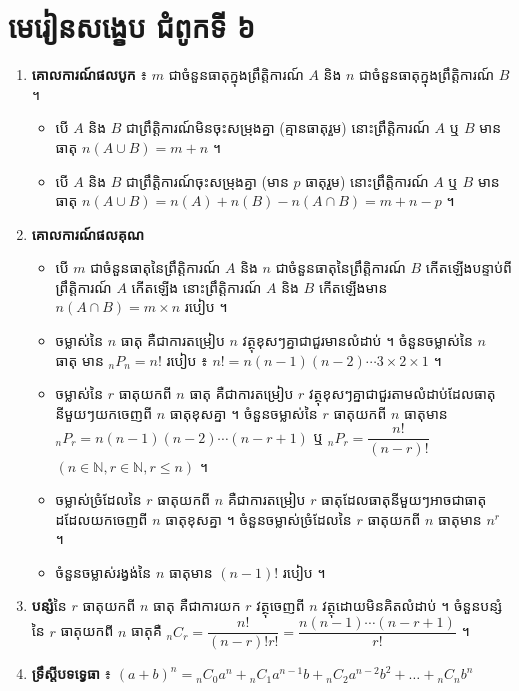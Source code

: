 \section*{មេរៀនសង្ខេប ជំពូកទី ៦}
\begin{note}[មេរៀនសង្ខេប]
\begin{enumerate}[1]
  \item \textbf{គោលការណ៍ផលបូក} ៖ $m$ ជាចំនួនធាតុក្នុងព្រឹត្តិការណ៍ $A$ និង $n$ ជាចំនួនធាតុក្នុងព្រឹត្តិការណ៍ $B$ ។
  \begin{itemize}
    \item បើ $A$ និង $B$ ជាព្រឹត្តិការណ៍មិនចុះសម្រុងគ្នា (គ្មានធាតុរួម) នោះព្រឹត្តិការណ៍ $A$ ឬ $B$ មានធាតុ $n(A \cup B) = m + n$ ។
    \item បើ $A$ និង $B$ ជាព្រឹត្តិការណ៍ចុះសម្រុងគ្នា (មាន $p$ ធាតុរួម) នោះព្រឹត្តិការណ៍ $A$ ឬ $B$ មានធាតុ $n(A \cup B) = n(A) + n(B) - n(A \cap B) = m + n - p$ ។
  \end{itemize}
  \item \textbf{គោលការណ៍ផលគុណ}
  \begin{itemize}
    \item បើ $m$ ជាចំនួនធាតុនៃព្រឹត្តិការណ៍ $A$ និង $n$ ជាចំនួនធាតុនៃព្រឹត្តិការណ៍ $B$ កើតឡើងបន្ទាប់ពីព្រឹត្តិការណ៍ $A$ កើតឡើង នោះព្រឹត្តិការណ៍ $A$ និង $B$ កើតឡើងមាន $n(A \cap B) = m\times n$ របៀប ។
    \item ចម្លាស់នៃ $n$ ធាតុ គឺជាការតម្រៀប $n$ វត្ថុខុសៗគ្នាជាជួរមានលំដាប់ ។ ចំនួនចម្លាស់នៃ $n$ ធាតុ មាន ${}_nP_n = n!$ របៀប ៖ $n! = n(n - 1)(n - 2)\cdots 3\times 2\times 1$ ។
    \item ចម្លាស់នៃ $r$ ធាតុយកពី $n$ ធាតុ គឺជាការតម្រៀប $r$ វត្ថុខុសៗគ្នាជាជួរតាមលំដាប់ដែលធាតុនីមួយៗយកចេញពី $n$ ធាតុខុសគ្នា ។ ចំនួនចម្លាស់នៃ $r$ ធាតុយកពី $n$ ធាតុមាន ${}_nP_r = n(n - 1)(n - 2)\cdots(n - r + 1)$ ឬ ${}_nP_r = \dfrac{n!}{(n - r)!}$ $(n \in \mathbb{N}, r \in \mathbb{N}, r \le n)$ ។
    \item ចម្លាស់ច្រំដែលនៃ $r$ ធាតុយកពី $n$ គឺជាការតម្រៀប $r$ ធាតុដែលធាតុនីមួយៗអាចជាធាតុដដែលយកចេញពី $n$ ធាតុខុសគ្នា ។ ចំនួនចម្លាស់ច្រំដែលនៃ $r$ ធាតុយកពី $n$ ធាតុមាន $n^r$ ។
    \item ចំនួនចម្លាស់រង្វង់នៃ $n$ ធាតុមាន $(n - 1)!$ របៀប ។
  \end{itemize}
  \item \textbf{បន្សំ}នៃ $r$ ធាតុយកពី $n$ ធាតុ គឺជាការយក $r$ វត្ថុចេញពី $n$ វត្ថុដោយមិនគិតលំដាប់ ។ ចំនួនបន្សំនៃ $r$ ធាតុយកពី $n$ ធាតុគឺ ${}_nC_r = \dfrac{n!}{(n - r)!r!} = \dfrac{n(n - 1)\cdots(n - r + 1)}{r!}$ ។
  \item \textbf{ទ្រឹស្ដីបទទ្វេធា} ៖ $(a + b)^n = {}_nC_0 a^n + {}_nC_1 a^{n-1}b + {}_nC_2 a^{n-2}b^2 + \dots + {}_nC_n b^n$

\end{enumerate}
\end{note}
